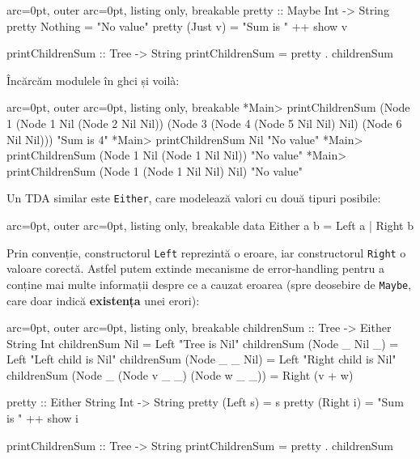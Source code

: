 \begin{tcblisting}{ arc=0pt, outer arc=0pt, listing only, breakable}
pretty :: Maybe Int -> String
pretty Nothing = "No value"
pretty (Just v) = "Sum is " ++ show v

printChildrenSum :: Tree -> String
printChildrenSum = pretty . childrenSum

\end{tcblisting}


Încărcăm modulele în ghci și voilà:

\begin{tcblisting}{ arc=0pt, outer arc=0pt, listing only, breakable}
*Main> printChildrenSum (Node 1 (Node 1 Nil (Node 2 Nil Nil)) (Node 3 (Node 4 (Node 5 Nil Nil) Nil) (Node 6 Nil Nil)))
"Sum is 4"
*Main> printChildrenSum Nil
"No value"
*Main> printChildrenSum (Node 1 Nil (Node 1 Nil Nil))
"No value"
*Main> printChildrenSum (Node 1 (Node 1 Nil Nil) Nil)
"No value"

\end{tcblisting}


Un TDA similar este \texttt{Either}, care modelează valori cu două tipuri posibile:


\begin{tcblisting}{ arc=0pt, outer arc=0pt, listing only, breakable}
data Either a b = Left a | Right b

\end{tcblisting}


Prin convenție, constructorul \texttt{Left} reprezintă o eroare, iar constructorul \texttt{Right} o valoare corectă. Astfel putem extinde mecanisme de error-handling pentru a conține mai multe informații despre ce a cauzat eroarea (spre deosebire de \texttt{Maybe}, care doar indică \textbf{existența} unei erori):


\begin{tcblisting}{ arc=0pt, outer arc=0pt, listing only, breakable}
childrenSum :: Tree -> Either String Int
childrenSum Nil = Left "Tree is Nil"
childrenSum (Node _ Nil _) = Left "Left child is Nil"
childrenSum (Node _ _ Nil) = Left "Right child is Nil"
childrenSum (Node _ (Node v _ _) (Node w _ _)) = Right (v + w)

pretty :: Either String Int -> String
pretty (Left s) = s
pretty (Right i) = "Sum is " ++ show i

printChildrenSum :: Tree -> String
printChildrenSum = pretty . childrenSum

\end{tcblisting}



